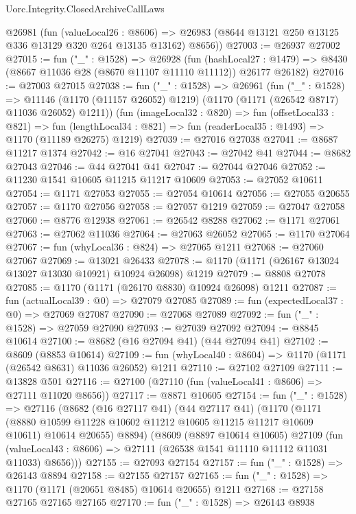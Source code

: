 \begin{lexlean}{Uorc.Integrity.ClosedArchiveCallLaws}
\begin{coremodule}
    @26981
      (fun (valueLocal26 : @8606) =>
      @26983 (@8644 @13121 @250 @13125 @336 @13129 @320 @264 @13135 @13162) @8656))
@27003 := @26937 @27002
@27015 := fun ("_" : @1528) =>
  @26928
    (fun (hashLocal27 : @1479) =>
    @8430 (@8667 @11036 @28 (@8670 @11107 @11110 @11112)) @26177 @26182)
@27016 := @27003 @27015
@27038 := fun ("_" : @1528) =>
  @26961
    (fun ("_" : @1528) =>
    @11146 (@1170 (@11157 @26052) @1219) (@1170 (@1171 (@26542 @8717) @11036 @26052) @1211))
    (fun (imageLocal32 : @820) =>
    fun (offsetLocal33 : @821) =>
    fun (lengthLocal34 : @821) => fun (readerLocal35 : @1493) => @1170 (@11189 @26275) @1219)
@27039 := @27016 @27038
@27041 := @8687 @11217 @1374
@27042 := @16 @27041
@27043 := @27042 @41
@27044 := @8682 @27043
@27046 := @44 @27041 @41
@27047 := @27044 @27046
@27052 := @11230 @1541 @10605 @11215 @11217 @10609
@27053 := @27052 @10611
@27054 := @1171 @27053
@27055 := @27054 @10614
@27056 := @27055 @20655
@27057 := @1170 @27056
@27058 := @27057 @1219
@27059 := @27047 @27058
@27060 := @8776 @12938
@27061 := @26542 @8288
@27062 := @1171 @27061
@27063 := @27062 @11036
@27064 := @27063 @26052
@27065 := @1170 @27064
@27067 := fun (whyLocal36 : @824) => @27065 @1211
@27068 := @27060 @27067
@27069 := @13021 @26433
@27078 := @1170 (@1171 (@26167 @13024 @13027 @13030 @10921) @10924 @26098) @1219
@27079 := @8808 @27078
@27085 := @1170 (@1171 (@26170 @8830) @10924 @26098) @1211
@27087 := fun (actualLocal39 : @0) => @27079 @27085
@27089 := fun (expectedLocal37 : @0) => @27069 @27087
@27090 := @27068 @27089
@27092 := fun ("_" : @1528) => @27059 @27090
@27093 := @27039 @27092
@27094 := @8845 @10614
@27100 := @8682 (@16 @27094 @41) (@44 @27094 @41)
@27102 := @8609 (@8853 @10614)
@27109 := fun (whyLocal40 : @8604) => @1170 (@1171 (@26542 @8631) @11036 @26052) @1211
@27110 := @27102 @27109
@27111 := @13828 @501
@27116 := @27100 (@27110 (fun (valueLocal41 : @8606) => @27111 @11020 @8656))
@27117 := @8871 @10605
@27154 := fun ("_" : @1528) =>
  @27116
    (@8682
      (@16 @27117 @41)
      (@44 @27117 @41)
      (@1170
        (@1171 (@8880 @10599 @11228 @10602 @11212 @10605 @11215 @11217 @10609 @10611) @10614 @20655)
        @8894)
      (@8609
        (@8897 @10614 @10605)
        @27109
        (fun (valueLocal43 : @8606) => @27111 (@26538 @1541 @11110 @11112 @11031 @11033) @8656)))
@27155 := @27093 @27154
@27157 := fun ("_" : @1528) => @26143 @8894
@27158 := @27155 @27157
@27165 := fun ("_" : @1528) => @1170 (@1171 (@20651 @8485) @10614 @20655) @1211
@27168 := @27158 @27165 @27165 @27165
@27170 := fun ("_" : @1528) => @26143 @8938

\end{coremodule}
\end{lexlean}
